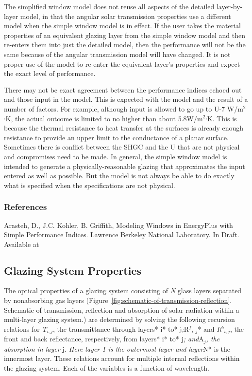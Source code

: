 The simplified window model does not reuse all aspects of the detailed layer-by-layer model, in that the angular solar transmission properties use a different model when the simple window model is in effect. If the user takes the material properties of an equivalent glazing layer from the simple window model and then re-enters them into just the detailed model, then the performance will not be the same because of the angular transmission model will have changed. It is not proper use of the model to re-enter the equivalent layer's properties and expect the exact level of performance.

There may not be exact agreement between the performance indices echoed out and those input in the model. This is expected with the model and the result of a number of factors. For example, although input is allowed to go up to U-7 W/m\(^{2}\)∙K, the actual outcome is limited to no higher than about 5.8W/m\(^{2}\)∙K. This is because the thermal resistance to heat transfer at the surfaces is already enough resistance to provide an upper limit to the conductance of a planar surface. Sometimes there is conflict between the SHGC and the U that are not physical and compromises need to be made. In general, the simple window model is intended to generate a physically-reasonable glazing that approximates the input entered as well as possible. But the model is not always be able to do exactly what is specified when the specifications are not physical.

\subsubsection{References}\label{references-054}

Arasteh, D., J.C. Kohler, B. Griffith, Modeling Windows in EnergyPlus with Simple Performance Indices. Lawrence Berkeley National Laboratory. In Draft. Available at

\subsection{Glazing System Properties}\label{glazing-system-properties}

The optical properties of a glazing system consisting of \emph{N} glass layers separated by nonabsorbing gas layers (Figure~\ref{fig:schematic-of-transmission-reflection}.~ Schematic of transmission, reflection and absorption of solar radiation within a multi-layer glazing system.) are determined by solving the following recursion relations for \emph{T\(_{i,j}\)}, the transmittance through layers* i* to* j\emph{;}R\(^{f}\)\(_{i,j}\)* and \emph{R\(^{b}\)\(_{i,j}\)}, the front and back reflectance, respectively, from layers* i* to* j\emph{; and}A\(_{j}\)\emph{, the absorption in layer} j\emph{. Here layer 1 is the outermost layer and layer}N* is the innermost layer. These relations account for multiple internal reflections within the glazing system. Each of the variables is a function of wavelength.

